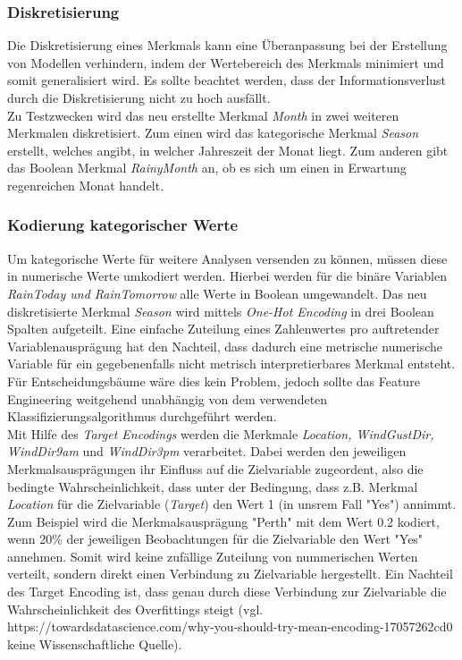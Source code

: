 \subsubsection{Diskretisierung}
Die Diskretisierung eines Merkmals kann eine Überanpassung bei der Erstellung von Modellen verhindern, indem der Wertebereich des Merkmals minimiert und somit generalisiert wird. Es sollte beachtet werden, dass der Informationsverlust durch die Diskretisierung nicht zu hoch ausfällt.\\
\noindent \hspace*{7mm}
Zu Testzwecken wird das neu erstellte Merkmal \emph{Month} in zwei weiteren Merkmalen diskretisiert. Zum einen wird das kategorische Merkmal \emph{Season} erstellt, welches angibt,  in welcher Jahreszeit der Monat liegt. Zum anderen gibt das Boolean Merkmal \emph{RainyMonth} an, ob es sich um einen in Erwartung regenreichen Monat handelt.

\subsubsection{Kodierung kategorischer Werte}
Um kategorische Werte für weitere Analysen versenden zu können, müssen diese in numerische Werte umkodiert werden. Hierbei werden für die binäre Variablen \emph{RainToday und RainTomorrow} alle Werte in Boolean umgewandelt. Das neu diskretisierte Merkmal \emph{Season} wird mittels \emph{One-Hot Encoding} in drei Boolean Spalten aufgeteilt. Eine einfache Zuteilung eines Zahlenwertes pro auftretender Variablenausprägung hat den Nachteil, dass dadurch eine metrische numerische Variable für ein gegebenenfalls nicht metrisch interpretierbares Merkmal entsteht. Für Entscheidungsbäume wäre dies kein Problem, jedoch sollte das Feature Engineering weitgehend unabhängig von dem verwendeten Klassifizierungsalgorithmus durchgeführt werden.\\
\noindent \hspace*{7mm}
Mit Hilfe des \emph{Target Encodings} werden die Merkmale \emph{Location, WindGustDir, WindDir9am} und \emph{WindDir3pm} verarbeitet. Dabei werden den jeweiligen Merkmalsausprägungen ihr Einfluss auf die Zielvariable zugeordent, also die bedingte Wahrscheinlichkeit, dass unter der Bedingung, dass z.B. Merkmal \emph{Location} für die Zielvariable (\emph{Target}) den Wert 1 (in unsrem Fall "Yes") annimmt. Zum Beispiel wird die Merkmalsausprägung "Perth" mit dem Wert 0.2 kodiert, wenn 20\% der jeweiligen Beobachtungen für die Zielvariable den Wert "Yes"  annehmen.  Somit wird keine zufällige Zuteilung von nummerischen Werten verteilt, sondern direkt einen Verbindung zu Zielvariable hergestellt. Ein Nachteil des Target Encoding ist, dass genau durch diese Verbindung zur Zielvariable die Wahrscheinlichkeit des Overfittings steigt (vgl. https://towardsdatascience.com/why-you-should-try-mean-encoding-17057262cd0   keine Wissenschaftliche Quelle).


